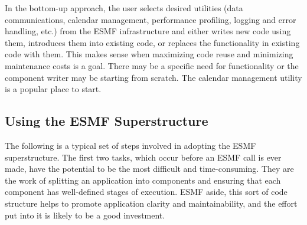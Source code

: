 In the bottom-up approach, the user selects desired utilities 
(data communications, calendar management, performance profiling,
logging and error handling, etc.) from the ESMF infrastructure 
and either writes new code using them, introduces them into 
existing code, or replaces the functionality in existing code 
with them.  This makes sense when maximizing code reuse and 
minimizing maintenance costs is a goal.  There may be a specific
need for functionality or the component writer may be starting
from scratch.  The calendar management utility is a popular
place to start.

\subsection{Using the ESMF Superstructure}

The following is a typical set of steps involved in adopting
the ESMF superstructure.  The first two tasks, which occur 
before an ESMF call is ever made, have the potential to be 
the most difficult and time-consuming.  They are the work 
of splitting an application into components and ensuring that
each component has well-defined stages of execution.  ESMF
aside, this sort of code structure helps to promote application
clarity and maintainability, and the effort put into it is likely
to be a good investment.

